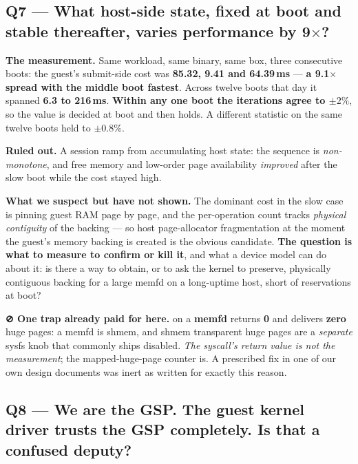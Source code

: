 \documentclass[10.5pt]{article}
\begin{document}
\subsection*{Q7 --- What host-side state, fixed at boot and stable thereafter, varies performance by 9$\times$?}

\textbf{The measurement.} Same workload, same binary, same box, three consecutive boots: the
guest's submit-side cost was \textbf{85.32, 9.41 and 64.39\,ms} — \textbf{a 9.1$\times$ spread
with the middle boot fastest}. Across twelve boots that day it spanned \textbf{6.3 to 216\,ms}.
\textbf{Within any one boot the iterations agree to $\pm 2\%$}, so the value is decided at boot
and then holds. A different statistic on the same twelve boots held to $\pm 0.8\%$.

\textbf{Ruled out.} A session ramp from accumulating host state: the sequence is \emph{non-monotone},
and free memory and low-order page availability \emph{improved} after the slow boot while the cost
stayed high.

\textbf{What we suspect but have not shown.} The dominant cost in the slow case is pinning guest
RAM page by page, and the per-operation count tracks \emph{physical contiguity} of the backing —
so host page-allocator fragmentation at the moment the guest's memory backing is created is the
obvious candidate. \textbf{The question is what to measure to confirm or kill it}, and what a
device model can do about it: is there a way to obtain, or to ask the kernel to preserve,
physically contiguous backing for a large memfd on a long-uptime host, short of 
reservations at boot?

\textbf{⊘ One trap already paid for here.}  on a \textbf{memfd} returns
\textbf{0} and delivers \textbf{zero} huge pages: a memfd is shmem, and shmem transparent huge
pages are a \emph{separate} sysfs knob that commonly ships disabled. \emph{The syscall's return
value is not the measurement}; the mapped-huge-page counter is. A prescribed fix in one of our own
design documents was inert as written for exactly this reason.

\subsection*{Q8 --- We are the GSP. The guest kernel driver trusts the GSP completely. Is that a confused deputy?}
\end{document}
